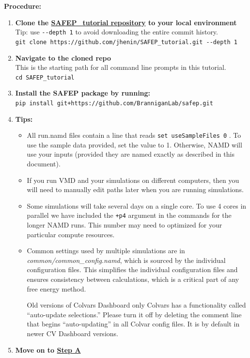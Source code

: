 \documentclass[9pt,tutorial]{Styling/livecoms}
\newcommand{\filepath}[1]{\textit{#1}}
\newcommand{\textInput}[1]{
  \texttt{#1}
}
\begin{document}
\textbf{Procedure:}
\begin{enumerate}
    \item \textbf{Clone the \href{https://github.com/jhenin/SAFEP_tutorial}{SAFEP\_tutorial repository} to your local environment} Tip: use \textInput{-{}-depth 1} to avoid downloading the entire commit history. \\
    \textInput{git clone https://github.com/jhenin/SAFEP\_tutorial.git -{}-depth 1}
    \item \textbf{Navigate to the cloned repo}\\
    This is the starting path for all command line prompts in this tutorial. \\
    \textInput{cd SAFEP\_tutorial}
    \item \textbf{Install the SAFEP package by running:}\\
    \textInput{pip install git+https://github.com/BranniganLab/safep.git}
    \item \textbf{Tips:} 
    \begin{itemize}
    \item All run.namd files contain a line that reads \textInput{set useSampleFiles 0}. To use the sample data provided, set the value to 1. Otherwise, NAMD will use your inputs (provided they are named exactly as described in this document).
    \item If you run VMD and your simulations on different computers, then you will need to manually edit paths later when you are running simulations. 
    \item Some simulations will take several days on a single core. To use 4 cores in parallel we have included the \textInput{+p4} argument in the commands for the longer NAMD runs. This number may need to optimized for your particular compute resources.
    \item Common settings used by multiple simulations are in \filepath{common/common\_config.namd}, which is sourced by the individual configuration files. This simplifies the individual configuration files and ensures consistency between calculations, which is a critical part of any free energy method.
    \item [Old versions of Colvars Dashboard only] Colvars has a functionality called ``auto-update selections.'' Please turn it off by deleting the comment line that begins ``auto-updating'' in all Colvar config files. It is by default in newer CV Dashboard versions.
    \end{itemize}
    \item \textbf{Move on to \hyperref[step:equilibrium]{Step A}}
\end{enumerate}
\end{document}
